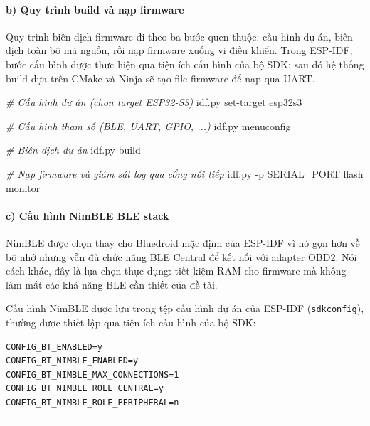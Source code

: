\documentclass[a4paper]{extarticle}
\newenvironment{Shaded}{}{}
\newcommand{\AttributeTok}[1]{\textcolor[rgb]{0.49,0.56,0.16}{#1}}
\newcommand{\CommentTok}[1]{\textcolor[rgb]{0.38,0.63,0.69}{\textit{#1}}}
\newcommand{\ExtensionTok}[1]{#1}
\newcommand{\NormalTok}[1]{#1}
\begin{document}
\paragraph{b) Quy trình build và nạp
firmware}\label{b-quy-truxecnh-build-vuxe0-nux1ea1p-firmware}

Quy trình biên dịch firmware đi theo ba bước quen thuộc: cấu hình dự án,
biên dịch toàn bộ mã nguồn, rồi nạp firmware xuống vi điều khiển. Trong
ESP-IDF, bước cấu hình được thực hiện qua tiện ích cấu hình của bộ SDK;
sau đó hệ thống build dựa trên CMake và Ninja sẽ tạo file firmware để
nạp qua UART.

\begin{Shaded}
\begin{Highlighting}[]
\CommentTok{\# Cấu hình dự án (chọn target ESP32{-}S3)}
\ExtensionTok{idf.py}\NormalTok{ set{-}target esp32s3}

\CommentTok{\# Cấu hình tham số (BLE, UART, GPIO, ...)}
\ExtensionTok{idf.py}\NormalTok{ menuconfig}

\CommentTok{\# Biên dịch dự án}
\ExtensionTok{idf.py}\NormalTok{ build}

\CommentTok{\# Nạp firmware và giám sát log qua cổng nối tiếp}
\ExtensionTok{idf.py} \AttributeTok{{-}p}\NormalTok{ SERIAL\_PORT flash monitor}
\end{Highlighting}
\end{Shaded}

\paragraph{c) Cấu hình NimBLE BLE
stack}\label{c-cux1ea5u-huxecnh-nimble-ble-stack}

NimBLE được chọn thay cho Bluedroid mặc định của ESP-IDF vì nó gọn hơn
về bộ nhớ nhưng vẫn đủ chức năng BLE Central để kết nối với adapter
OBD2. Nói cách khác, đây là lựa chọn thực dụng: tiết kiệm RAM cho
firmware mà không làm mất các khả năng BLE cần thiết của đề tài.

Cấu hình NimBLE được lưu trong tệp cấu hình dự án của ESP-IDF
(\texttt{sdkconfig}), thường được thiết lập qua tiện ích cấu hình của bộ
SDK:

\begin{verbatim}
CONFIG_BT_ENABLED=y
CONFIG_BT_NIMBLE_ENABLED=y
CONFIG_BT_NIMBLE_MAX_CONNECTIONS=1
CONFIG_BT_NIMBLE_ROLE_CENTRAL=y
CONFIG_BT_NIMBLE_ROLE_PERIPHERAL=n
\end{verbatim}

\begin{center}\rule{0.5\linewidth}{0.5pt}\end{center}
\end{document}
